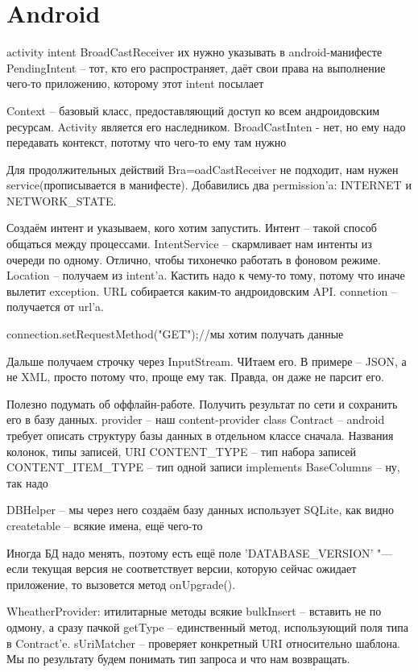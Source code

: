 \chapter{Android}

activity%
intent%
BroadCastReceiver%
их нужно указывать в android-манифесте
PendingIntent -- тот, кто его распространяет, даёт свои права на выполнение чего-то приложению, которому этот intent посылает

Context -- базовый класс, предоставляющий доступ ко всем андроидовским ресурсам. Activity является его наследником. BroadCastInten - нет,
но ему надо передавать контекст, пототму что чего-то ему там нужно

Для продолжительных действий Bra=oadCastReceiver не подходит, нам нужен service(прописывается в манифесте). 
Добавились два permission'a: INTERNET и NETWORK\_STATE.

Создаём интент и указываем, кого хотим запустить. Интент -- такой способ общаться между процессами.
IntentService -- скармливает нам интенты из очереди по одному. Отлично, чтобы тихонечко работать в фоновом режиме.
Location -- получаем из intent'a. Кастить надо к чему-то тому, потому что иначе вылетит exception.
URL собирается каким-то андроидовским API.
connetion -- получается от url'a.
\begin{javacode}
connection.setRequestMethod("GET");//мы хотим получать данные
\end{javacode}
Дальше получаем строчку через InputStream. ЧИтаем его. В примере -- JSON, а не XML, просто потому что, проще ему так. 
Правда, он даже не парсит его.


Полезно подумать об оффлайн-работе.
Получить результат по сети и сохранить его в базу данных.
provider -- наш content-provider
class Contract -- android требует описать структуру базы данных в отдельном классе сначала.
Названия колонок, типы записей, URI
CONTENT\_TYPE -- тип набора записей
CONTENT\_ITEM\_TYPE -- тип одной записи
implements BaseColumns -- ну, так надо

DBHelper -- мы через него создаём  базу данных
использует SQLite, как видно
createtable -- всякие имена, ещё чего-то

Иногда БД надо менять, поэтому есть ещё поле 'DATABASE\_VERSION'
"--- 
если текущая версия не соответствует версии, 
которую сейчас ожидает приложение, то 
вызовется метод onUpgrade().

WheatherProvider: итилитарные методы всякие
bulkInsert -- вставить не по одмону, а сразу пачкой
getType -- единственный метод, использующий поля типа в Contract'e.
sUriMatcher -- проверяет конкретный URI относительно шаблона. 
Мы по результату будем понимать тип запроса и что нам возвращать.

